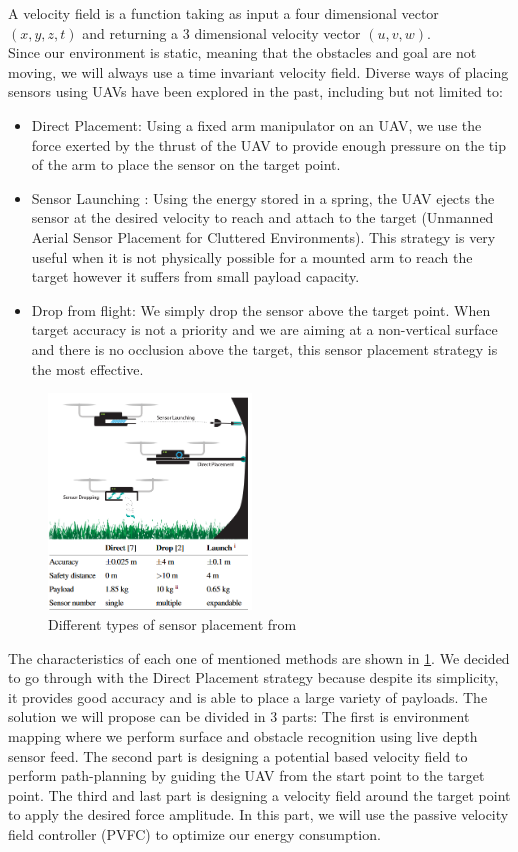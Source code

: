 A velocity field is a function taking as input  a four dimensional vector $(x,y,z,t)$ and returning a 3 dimensional velocity vector $(u,v,w)$.\\
Since our environment is static, meaning that the obstacles and goal are not moving, we will always use a time invariant velocity field.
Diverse ways of placing sensors using UAVs have been explored in the past, including but not limited to: 
\begin{itemize}
    \item Direct Placement: Using a fixed arm manipulator on an UAV, we use the force exerted by the thrust of the UAV to provide enough pressure on the tip of the arm to place the sensor on the target point.
    \item Sensor Launching \cite{farinha2020unmanned}: Using the energy stored in a spring, the UAV ejects the sensor at the desired velocity to reach and attach to the target (Unmanned Aerial Sensor Placement for Cluttered Environments). This strategy is very useful when it is not physically possible for a mounted arm to reach the target however it suffers from small payload capacity.
    \item Drop from flight: We simply drop the sensor above the target point. When target accuracy is not a priority and we are aiming at a non-vertical surface and there is no occlusion above the target,  this sensor placement strategy is the most effective. 
\end{itemize}
\begin{figure}[h!]
    \centering
    \includegraphics[width=0.48\textwidth]{Images/threeway.png}
    \caption{Different types of sensor placement from \cite{farinha2020unmanned}}
    \label{fig:threeway}
\end{figure}
The characteristics of each one of mentioned methods are shown in \ref{fig:threeway}.
We decided to go through with the Direct Placement strategy because despite its simplicity, it provides good accuracy and is able to place a large variety of payloads. 
The solution we will propose can be divided in 3 parts: The first is environment mapping where we perform surface and obstacle recognition using live depth sensor feed. The second part is designing a potential based velocity field to perform path-planning by guiding the UAV from the start point to the target point. The third and last part is designing a velocity field around the target point to apply the desired force amplitude. In this part, we will use the passive velocity field controller (PVFC) to optimize our energy consumption.
